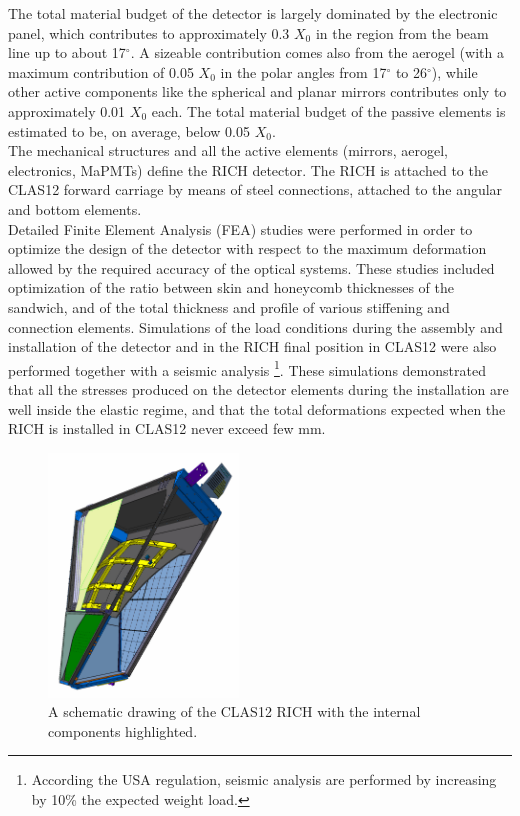 \documentclass[5p,times,twocolumn]{elsarticle}
\begin{document}
The total material budget of the detector is largely dominated by the electronic panel, which contributes to approximately 0.3 $X_0$ in the region from the beam line up to about 17$^\circ$.
A sizeable contribution comes also from the aerogel (with a maximum contribution of 0.05 $X_0$ in the polar angles from 17$^\circ$ to 26$^\circ$), while other active components like the spherical and planar mirrors contributes only to approximately 0.01 $X_0$ each.
The total material budget of the passive elements is estimated to be, on average, below 0.05 $X_0$.\\
The mechanical structures and all the active elements (mirrors, aerogel, electronics, MaPMTs) define the RICH detector.
The RICH is attached to the CLAS12 forward carriage by means of steel connections, attached to the angular and bottom elements.\\
Detailed Finite Element Analysis (FEA) studies were performed in order to optimize the design of the detector with respect to the maximum deformation allowed by the required accuracy of the optical systems.
These studies included optimization of the ratio between skin and honeycomb thicknesses of the sandwich, and of the total thickness and profile of various stiffening and connection elements.
Simulations of the load conditions during the assembly and installation of the detector and in the RICH final position in CLAS12 were also performed together with a seismic analysis \footnote{According the USA regulation, seismic analysis are performed by increasing by 10\% the expected weight load.}.
These simulations demonstrated that all the stresses produced on the detector elements during the installation are well inside the elastic regime, and that the total deformations expected when the RICH is installed in CLAS12 never exceed few mm.


\begin{figure}
\begin{center}
\includegraphics[width=0.45\textwidth]{RICH.pdf}
\caption{A schematic drawing of the CLAS12 RICH with the internal components highlighted.}
\label{Fig:RICHexplo}
\end{center}
\end{figure}
\end{document}
